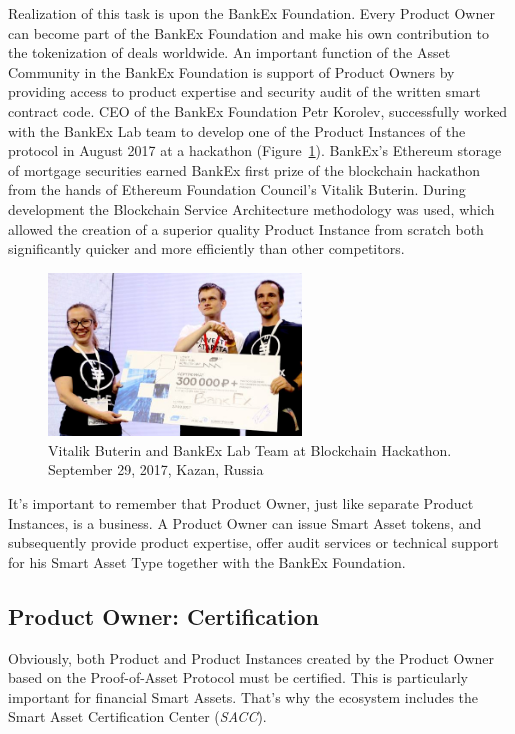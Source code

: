 \documentclass{article}
\begin{document}
\begin{multicols}{2}
Realization of this task is upon the BankEx Foundation. Every Product Owner can become part of the BankEx Foundation and make his own contribution to the tokenization of deals worldwide. An important function of the Asset Community in the BankEx Foundation is support of Product Owners by providing access to product expertise and security audit of the written smart contract code.
CEO of the BankEx Foundation Petr Korolev, successfully worked with the BankEx Lab team to develop one of the Product Instances of the protocol in August 2017 at a hackathon (Figure~\ref{fig:hackathon-2017}). BankEx’s Ethereum storage of mortgage securities earned BankEx first prize of the blockchain hackathon from the hands of Ethereum Foundation Council’s Vitalik Buterin. During development the Blockchain Service Architecture methodology was used, which allowed the creation of a superior quality Product Instance from scratch both significantly quicker and more efficiently than other competitors.

\begin{figure}
  \centering
  \includegraphics[width=0.6\textwidth]{hackathon-2017.jpg}
  \caption{Vitalik Buterin and BankEx Lab Team at Blockchain Hackathon. September 29, 2017, Kazan, Russia}
  \label{fig:hackathon-2017}
\end{figure}

It's important to remember that Product Owner, just like separate Product Instances, is a business. A Product Owner can issue Smart Asset tokens, and subsequently provide product expertise, offer audit services or technical support for his Smart Asset Type together with the BankEx Foundation.

\subsection{Product Owner: Certification}

Obviously, both Product and Product Instances created by the Product Owner based on the Proof-of-Asset Protocol must be certified. This is particularly important for financial Smart Assets. That’s why the ecosystem includes the Smart Asset Certification Center (\textit{SACC}).


\end{multicols}
\end{document}
